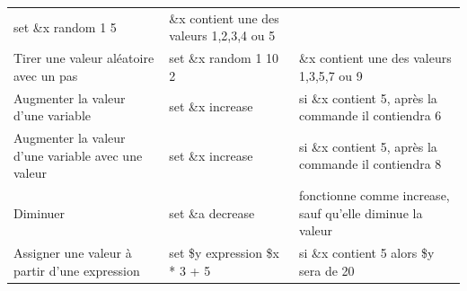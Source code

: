 \documentclass[
]{book}
\begin{document}
\begin{longtable}[]{@{}lll@{}}
\begin{minipage}[t]{0.20\columnwidth}
set \&x random 1 5\strut
\end{minipage} & \begin{minipage}[t]{0.40\columnwidth}\raggedright
\&x contient une des valeurs 1,2,3,4 ou 5\strut
\end{minipage}\tabularnewline
\begin{minipage}[t]{0.32\columnwidth}\raggedright
Tirer une valeur aléatoire avec un pas\strut
\end{minipage} & \begin{minipage}[t]{0.20\columnwidth}\raggedright
set \&x random 1 10 2\strut
\end{minipage} & \begin{minipage}[t]{0.40\columnwidth}\raggedright
\&x contient une des valeurs 1,3,5,7 ou 9\strut
\end{minipage}\tabularnewline
\begin{minipage}[t]{0.32\columnwidth}\raggedright
Augmenter la valeur d'une variable\strut
\end{minipage} & \begin{minipage}[t]{0.20\columnwidth}\raggedright
set \&x increase\strut
\end{minipage} & \begin{minipage}[t]{0.40\columnwidth}\raggedright
si \&x contient 5, après la commande il contiendra 6\strut
\end{minipage}\tabularnewline
\begin{minipage}[t]{0.32\columnwidth}\raggedright
Augmenter la valeur d'une variable avec une valeur\strut
\end{minipage} & \begin{minipage}[t]{0.20\columnwidth}\raggedright
set \&x increase\strut
\end{minipage} & \begin{minipage}[t]{0.40\columnwidth}\raggedright
si \&x contient 5, après la commande il contiendra 8\strut
\end{minipage}\tabularnewline
\begin{minipage}[t]{0.32\columnwidth}\raggedright
Diminuer\strut
\end{minipage} & \begin{minipage}[t]{0.20\columnwidth}\raggedright
set \&a decrease\strut
\end{minipage} & \begin{minipage}[t]{0.40\columnwidth}\raggedright
fonctionne comme increase, sauf qu'elle diminue la valeur\strut
\end{minipage}\tabularnewline
\begin{minipage}[t]{0.32\columnwidth}\raggedright
Assigner une valeur à partir d'une expression\strut
\end{minipage} & \begin{minipage}[t]{0.20\columnwidth}\raggedright
set \$y expression \$x * 3 + 5\strut
\end{minipage} & \begin{minipage}[t]{0.40\columnwidth}\raggedright
si \&x contient 5 alors \$y sera de 20\strut
\end{minipage}\tabularnewline
\bottomrule
\end{longtable}
\end{document}
